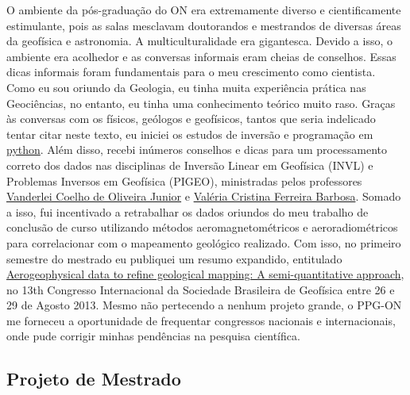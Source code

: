 \documentclass[10pt,a4paper,oneside]{book}
\begin{document}
O ambiente da pós-graduação do ON era extremamente diverso e cientificamente estimulante, pois as salas mesclavam doutorandos e mestrandos de diversas áreas da geofísica e astronomia. A multiculturalidade era gigantesca. Devido a isso, o ambiente era acolhedor e as conversas informais eram cheias de conselhos. Essas dicas informais foram fundamentais para o meu crescimento como cientista. Como eu sou oriundo da Geologia, eu tinha muita experiência prática nas Geociências, no entanto, eu tinha uma conhecimento teórico muito raso. Graças às conversas com os físicos, geólogos e geofísicos, tantos que seria indelicado tentar citar neste texto, eu iniciei os estudos de inversão e programação em \href{https://www.python.org/}{python}. Além disso, recebi inúmeros conselhos e dicas para um processamento correto dos dados nas disciplinas de Inversão Linear em Geofísica (INVL) e Problemas Inversos em Geofísica (PIGEO), ministradas pelos professores \href{http://lattes.cnpq.br/4332841435949533}{Vanderlei Coelho de Oliveira Junior} e \href{http://lattes.cnpq.br/0391036221142471}{Valéria Cristina Ferreira Barbosa}. Somado a isso, fui incentivado a retrabalhar os dados oriundos do meu trabalho de conclusão de curso utilizando métodos aeromagnetométricos e aeroradiométricos para correlacionar com o mapeamento geológico realizado. Com isso, no primeiro semestre do mestrado eu publiquei um resumo expandido, entitulado \href{https://doi.org/10.1190/sbgf2013-129}{Aerogeophysical data to refine geological mapping: A semi-quantitative approach}, no 13th Congresso Internacional da Sociedade Brasileira de Geofísica entre 26 e 29 de Agosto 2013. Mesmo não pertecendo a nenhum projeto grande, o PPG-ON me forneceu a oportunidade de frequentar congressos nacionais e internacionais, onde pude corrigir minhas pendências na pesquisa científica.

\subsection{Projeto de Mestrado}
\label{sec_proj_mest}
\end{document}

